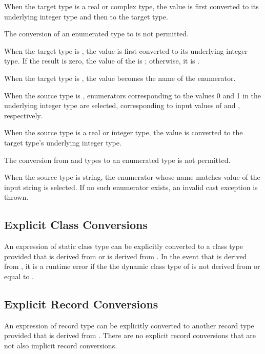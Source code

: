 When the target type is a real or complex type, the value is first converted to
its underlying integer type and then to the target type.

The conversion of an enumerated type to  is not permitted.

When the target type is , the value is first converted to its
underlying integer type.  If the result is zero, the value of the 
is ; otherwise, it is .

When the target type is , the value becomes the name of the
enumerator.  %

When the source type is , enumerators corresponding to the values 0
and 1 in the underlying integer type are selected, corresponding to input values
of  and , respectively.


When the source type is a real or integer type, the value is converted to the
target type's underlying integer type.  

The conversion from  and  types to an enumerated type is not
permitted.

When the source type is string, the enumerator whose name matches value of the input
string is selected.  If no such enumerator exists, an invalid cast exception
is thrown.

\subsection{Explicit Class Conversions}
\label{Explicit_Class_Conversions}

An expression of static class type  can be explicitly
converted to a class type  provided that  is derived
from  or  is derived from .  In the event
that  is derived from , it is a runtime error if the
the dynamic class type of  is not derived from or equal
to .

\subsection{Explicit Record Conversions}
\label{Explicit_Record_Conversions}

An expression of record type  can be explicitly converted to
another record type  provided that  is derived
from .  There are no explicit record conversions that are not
also implicit record conversions.
